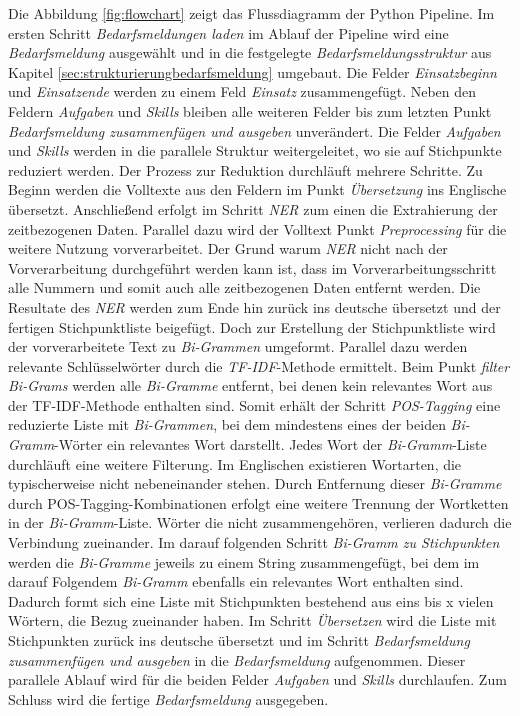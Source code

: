 Die Abbildung \ref{fig:flowchart} zeigt das Flussdiagramm der Python Pipeline. Im ersten Schritt \emph{Bedarfsmeldungen laden} im Ablauf der Pipeline wird eine \emph{Bedarfsmeldung} ausgewählt und in die festgelegte \emph{Bedarfsmeldungsstruktur} aus Kapitel \ref{sec:strukturierungbedarfsmeldung} umgebaut. Die Felder \emph{Einsatzbeginn} und \emph{Einsatzende} werden zu einem Feld \emph{Einsatz} zusammengefügt. Neben den Feldern \emph{Aufgaben} und \emph{Skills} bleiben alle weiteren Felder bis zum letzten Punkt \emph{Bedarfsmeldung zusammenfügen und ausgeben} unverändert. Die Felder \emph{Aufgaben} und \emph{Skills} werden in die parallele Struktur weitergeleitet, wo sie auf Stichpunkte reduziert werden. Der Prozess zur Reduktion durchläuft mehrere Schritte. Zu Beginn werden die Volltexte aus den Feldern im Punkt \emph{Übersetzung} ins Englische übersetzt. Anschließend erfolgt im Schritt \emph{NER} zum einen die Extrahierung der zeitbezogenen Daten. Parallel dazu wird der Volltext Punkt \emph{Preprocessing} für die weitere Nutzung vorverarbeitet. Der Grund warum \emph{NER} nicht nach der Vorverarbeitung durchgeführt werden kann ist, dass im Vorverarbeitungsschritt alle Nummern und somit auch alle zeitbezogenen Daten entfernt werden. Die Resultate des \emph{NER} werden zum Ende hin zurück ins deutsche übersetzt und der fertigen Stichpunktliste beigefügt. Doch zur Erstellung der Stichpunktliste wird der vorverarbeitete Text zu \emph{Bi-Grammen} umgeformt. Parallel dazu werden relevante Schlüsselwörter durch die \emph{TF-IDF}-Methode ermittelt. Beim Punkt \emph{filter Bi-Grams} werden alle \emph{Bi-Gramme} entfernt, bei denen kein relevantes Wort aus der TF-IDF-Methode enthalten sind. Somit erhält der Schritt \emph{POS-Tagging} eine reduzierte Liste mit \emph{Bi-Grammen}, bei dem mindestens eines der beiden \emph{Bi-Gramm}-Wörter ein relevantes Wort darstellt. Jedes Wort der \emph{Bi-Gramm}-Liste durchläuft eine weitere Filterung. Im Englischen existieren Wortarten, die  typischerweise nicht nebeneinander stehen. Durch Entfernung dieser \emph{Bi-Gramme} durch POS-Tagging-Kombinationen erfolgt eine weitere Trennung der Wortketten in der \emph{Bi-Gramm}-Liste. Wörter die nicht zusammengehören, verlieren dadurch die Verbindung zueinander. Im darauf folgenden Schritt \emph{Bi-Gramm zu Stichpunkten} werden die \emph{Bi-Gramme} jeweils zu einem String zusammengefügt, bei dem im darauf Folgendem \emph{Bi-Gramm} ebenfalls ein relevantes Wort enthalten sind. Dadurch formt sich eine Liste mit Stichpunkten bestehend aus eins bis x vielen Wörtern, die Bezug zueinander haben. Im Schritt \emph{Übersetzen} wird die Liste mit Stichpunkten zurück ins deutsche übersetzt und im Schritt \emph{Bedarfsmeldung zusammenfügen und ausgeben} in die \emph{Bedarfsmeldung} aufgenommen. Dieser parallele Ablauf wird für die beiden Felder \emph{Aufgaben} und \emph{Skills} durchlaufen. Zum Schluss wird die fertige \emph{Bedarfsmeldung} ausgegeben.
